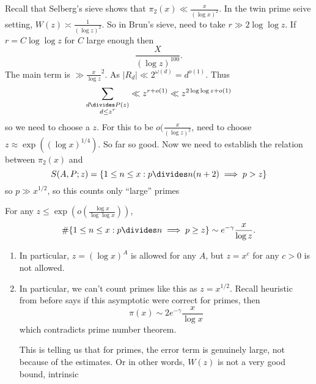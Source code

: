 \documentclass[a4paper]{article}
\theoremstyle{definition}
\begin{document}
Recall that Selberg's sieve shows that \(\pi_2(x) \ll \frac{x}{(\log x)^2}\). In the twin prime seive setting, \(W(z) \asymp \frac{1}{(\log z)^2}\). So in Brun's sieve, need to take \(r \gg 2 \log \log z\). If \(r = C \log \log z\) for \(C\) large enough then
\[
  \frac{X}{(\log z)^{100}}.
\]
The main term is \(\gg \frac{x}{\log z}^2\). As \(|R_d| \ll 2^{\omega(d)} = d^{o(1)}\). Thus
\[
  \sum_{\substack{d \divides P(z) \\ d \leq z^r}}
  \ll z^{r + o(1)}
  \ll z^{2 \log \log z + o(1)}
\]
so we need to choose a \(z\). For this to be \(o(\frac{x}{(\log z)^2}\), need to choose \(z \approx \exp((\log x)^{1/4})\). So far so good. Now we need to establish the relation between \(\pi_2(x)\) and
\[
  S(A, P; z) = \{1 \leq n \leq x: p \divides n(n + 2) \implies p > z\}
\]
so \(p \gg x^{1/2}\), so this counts only ``large'' primes

\begin{corollary}
  For any \(z \leq \exp (o(\frac{\log x}{\log \log x}))\),
  \[
    \#\{1 \leq n \leq x: p \divides n \implies p \geq z\} \sim e^{-\gamma} \frac{x}{\log z}.
  \]
\end{corollary}

\begin{remark}\leavevmode
  \begin{enumerate}
  \item In particular, \(z = (\log x)^A\) is allowed for any \(A\), but \(z = x^c\) for any \(c > 0\) is not allowed.
  \item In particular, we can't count primes like this as \(z = x^{1/2}\). Recall heuristic from before says if this asymptotic were correct for primes, then
    \[
      \pi(x) \sim 2e^{-\gamma} \frac{x}{\log x}
    \]
    which contradicts prime number theorem.

    This is telling us that for primes, the error term is genuinely large, not because of the estimates. Or in other words, \(W(z)\) is not a very good bound, intrinsic
  \end{enumerate}
\end{remark}
\end{document}
